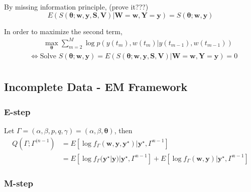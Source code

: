 \documentclass[10pt,letterpaper]{article}
\numberwithin{table}{section}
\numberwithin{figure}{section}
\numberwithin{equation}{section}
\begin{document}
By missing information principle, (prove it???)
\begin{equation}
E(S(\bm \theta; \bm w, \bm y, \bm S, \bm V)|\bm W = \bm w, \bm Y=\bm y) = S(\bm \theta; \bm w, \bm y)
\end{equation}

In order to maximize the second term, 
\begin{equation}
\begin{split}
& \qquad \max_{\bm \theta} \sum_{m=2}^M\log p(y(t_m), w(t_m)|y(t_{m-1}), w(t_{m-1})) \\
& \Leftrightarrow
\text{Solve } S(\bm \theta; \bm w, \bm y) = E(S(\bm \theta; \bm w, \bm y, \bm S, \bm V)|\bm W = \bm w, \bm Y=\bm y) = 0
 \\
\end{split}
\end{equation}













\subsection{Incomplete Data - EM Framework}



\subsubsection*{E-step}
Let $\Gamma =(\alpha,\beta, p,q,\gamma) =(\alpha,\beta, \bm \theta)$, then
\begin{equation}
\begin{split}
 Q(\Gamma; \Gamma^{(n-1}) 
 &= E[\log f_{\Gamma}(\bm w, \bm y, \bm y^\star) |\bm y^\star, \Gamma^{n-1}] \\
& = E[\log f_{\Gamma}(\bm y^\star|\bm y)| \bm y^\star, \Gamma^{n-1}] + E[\log f_{\Gamma}(\bm w, \bm y)| \bm y^\star, \Gamma^{n-1}] 
\end{split}
\end{equation}



\subsubsection*{M-step}
\end{document}
